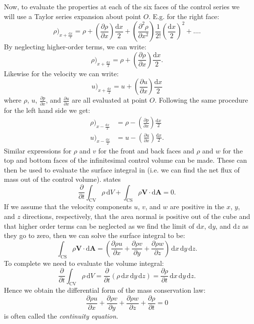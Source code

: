 Now, to evaluate the properties at each of the six faces of the control series we will use a Taylor series expansion about point $O$. E.g. for the right face:
\[ 
\rho)_{x + \frac{\mathrm{d}x}{2}} = \rho + \left( \frac{\partial \rho}{\partial x} \right) \frac{\mathrm{d}x}{2} + \left( \frac{\partial^2 \rho}{\partial x^2} \right) \frac{1}{2!} \left( \frac{\mathrm{d}x}{2} \right)^2 + \ldots
.\]
By neglecting higher-order terms, we can write:
\[ 
\rho)_{x + \frac{\mathrm{d}x}{2}} = \rho + \left( \frac{\partial \rho}{\partial x} \right) \frac{\mathrm{d}x}{2}
.\]
Likewise for the velocity we can write:
\[ 
u )_{x + \frac{\mathrm{d}x}{2}} = u + \left( \frac{\partial u}{\partial x} \right) \frac{\mathrm{d}x}{2}
\]
where $\rho$, $u$, $\frac{\partial p}{\partial x}$, and $\frac{\partial u}{\partial x}$ are all evaluated at point $O$. Following the same procedure for the left hand side we get:
\begin{align*}
  \rho)_{x - \frac{\mathrm{d}x}{2}} &= \rho - \left( \frac{\partial p}{\partial x} \right) \frac{\mathrm{d}x}{2} \\
  u)_{x - \frac{\mathrm{d}x}{2}} &= u - \left( \frac{\partial u}{\partial x} \right) \frac{\mathrm{d}x}{2}
.\end{align*}
Similar expressions for $\rho$ and $v$ for the front and back faces and $\rho$ and $w$ for the top and bottom faces of the infinitesimal control volume can be made. These can then be used to evaluate the surface integral in  (i.e. we can find the net flux of mass out of the control volume).  states
\[ 
\frac{\partial }{\partial t} \int_{\mathrm{CV}} \rho \, \mathrm{d}V + \int_{\mathrm{CS}} \rho \textbf{V} \cdot \mathrm{d}\textbf{A} = 0
.\]
If we assume that the velocity components $u$, $v$, and $w$ are positive in the $x$, $y$, and $z$ directions, respectively, that the area normal is positive out of the cube and that higher order terms can be neglected as we find the limit of $\mathrm{d}x$, $\mathrm{d}y$, and $\mathrm{d}z$ as they go to zero, then we can solve the surface integral to be:
\[ 
\int_{\mathrm{CS}} \rho \textbf{V} \cdot \mathrm{d}\textbf{A} = \left( \frac{\partial \rho u}{\partial x} + \frac{\partial \rho v}{\partial y} + \frac{\partial \rho w}{\partial z} \right) \, \mathrm{d}x \, \mathrm{d}y \, \mathrm{d}z
.\]
To complete  we need to evaluate the volume integral:
\[ 
\frac{\partial }{\partial t} \int_{\mathrm{CV}} \rho \, \mathrm{d}V = \frac{\partial }{\partial t} \left( \rho \, \mathrm{d}x \, \mathrm{d}y \, \mathrm{d}z \right) = \frac{\partial \rho}{\partial t} \, \mathrm{d}x \, \mathrm{d}y \, \mathrm{d}z
.\]
Hence we obtain the differential form of the mass conservation law:
\begin{equation}\label{eq:coneq1}
  \frac{\partial \rho u}{\partial x} + \frac{\partial \rho v}{\partial y} + \frac{\partial \rho w}{\partial z} + \frac{\partial \rho}{\partial t} = 0
\end{equation}
 is often called the \textit{continuity equation}.

